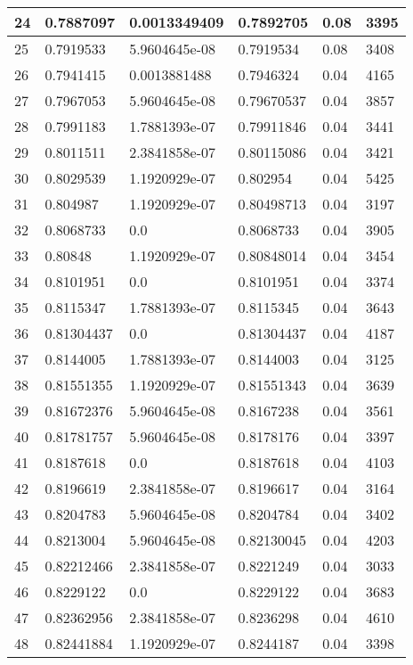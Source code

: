 \begin{longtable}{|l|l|l|l|l|l|}
24 & 0.7887097 & 0.0013349409 & 0.7892705 & 0.08 & 3395 \\ \hline 
25 & 0.7919533 & 5.9604645e-08 & 0.7919534 & 0.08 & 3408 \\ \hline 
26 & 0.7941415 & 0.0013881488 & 0.7946324 & 0.04 & 4165 \\ \hline 
27 & 0.7967053 & 5.9604645e-08 & 0.79670537 & 0.04 & 3857 \\ \hline 
28 & 0.7991183 & 1.7881393e-07 & 0.79911846 & 0.04 & 3441 \\ \hline 
29 & 0.8011511 & 2.3841858e-07 & 0.80115086 & 0.04 & 3421 \\ \hline 
30 & 0.8029539 & 1.1920929e-07 & 0.802954 & 0.04 & 5425 \\ \hline 
31 & 0.804987 & 1.1920929e-07 & 0.80498713 & 0.04 & 3197 \\ \hline 
32 & 0.8068733 & 0.0 & 0.8068733 & 0.04 & 3905 \\ \hline 
33 & 0.80848 & 1.1920929e-07 & 0.80848014 & 0.04 & 3454 \\ \hline 
34 & 0.8101951 & 0.0 & 0.8101951 & 0.04 & 3374 \\ \hline 
35 & 0.8115347 & 1.7881393e-07 & 0.8115345 & 0.04 & 3643 \\ \hline 
36 & 0.81304437 & 0.0 & 0.81304437 & 0.04 & 4187 \\ \hline 
37 & 0.8144005 & 1.7881393e-07 & 0.8144003 & 0.04 & 3125 \\ \hline 
38 & 0.81551355 & 1.1920929e-07 & 0.81551343 & 0.04 & 3639 \\ \hline 
39 & 0.81672376 & 5.9604645e-08 & 0.8167238 & 0.04 & 3561 \\ \hline 
40 & 0.81781757 & 5.9604645e-08 & 0.8178176 & 0.04 & 3397 \\ \hline 
41 & 0.8187618 & 0.0 & 0.8187618 & 0.04 & 4103 \\ \hline 
42 & 0.8196619 & 2.3841858e-07 & 0.8196617 & 0.04 & 3164 \\ \hline 
43 & 0.8204783 & 5.9604645e-08 & 0.8204784 & 0.04 & 3402 \\ \hline 
44 & 0.8213004 & 5.9604645e-08 & 0.82130045 & 0.04 & 4203 \\ \hline 
45 & 0.82212466 & 2.3841858e-07 & 0.8221249 & 0.04 & 3033 \\ \hline 
46 & 0.8229122 & 0.0 & 0.8229122 & 0.04 & 3683 \\ \hline 
47 & 0.82362956 & 2.3841858e-07 & 0.8236298 & 0.04 & 4610 \\ \hline 
48 & 0.82441884 & 1.1920929e-07 & 0.8244187 & 0.04 & 3398 \\ \hline 

\end{longtable}
